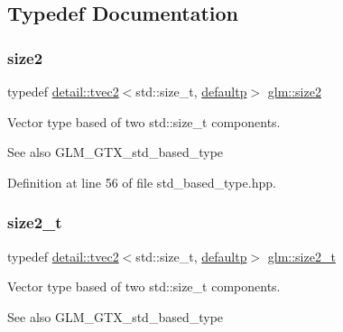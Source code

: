 \subsection{Typedef Documentation}
\mbox{\label{group__gtx__std__based__type_ga393e8beba20ea33452384087a2864f86}} 
\subsubsection{\texorpdfstring{size2}{size2}}
{\footnotesize\ttfamily typedef \hyperlink{structglm_1_1detail_1_1tvec2}{detail\+::tvec2}$<$std\+::size\+\_\+t, \hyperlink{namespaceglm_a0f04f086094c747d227af4425893f545a9d21ccd8b5a009ec7eb7677befc3bf51}{defaultp}$>$ \hyperlink{group__gtx__std__based__type_ga393e8beba20ea33452384087a2864f86}{glm\+::size2}}

Vector type based of two std\+::size\+\_\+t components. \begin{DoxySeeAlso}{See also}
G\+L\+M\+\_\+\+G\+T\+X\+\_\+std\+\_\+based\+\_\+type 
\end{DoxySeeAlso}


Definition at line 56 of file std\+\_\+based\+\_\+type.\+hpp.

\mbox{\label{group__gtx__std__based__type_ga64be170f9203528ff59efa40b1977bb0}} 
\subsubsection{\texorpdfstring{size2\+\_\+t}{size2\_t}}
{\footnotesize\ttfamily typedef \hyperlink{structglm_1_1detail_1_1tvec2}{detail\+::tvec2}$<$std\+::size\+\_\+t, \hyperlink{namespaceglm_a0f04f086094c747d227af4425893f545a9d21ccd8b5a009ec7eb7677befc3bf51}{defaultp}$>$ \hyperlink{group__gtx__std__based__type_ga64be170f9203528ff59efa40b1977bb0}{glm\+::size2\+\_\+t}}

Vector type based of two std\+::size\+\_\+t components. \begin{DoxySeeAlso}{See also}
G\+L\+M\+\_\+\+G\+T\+X\+\_\+std\+\_\+based\+\_\+type 
\end{DoxySeeAlso}


